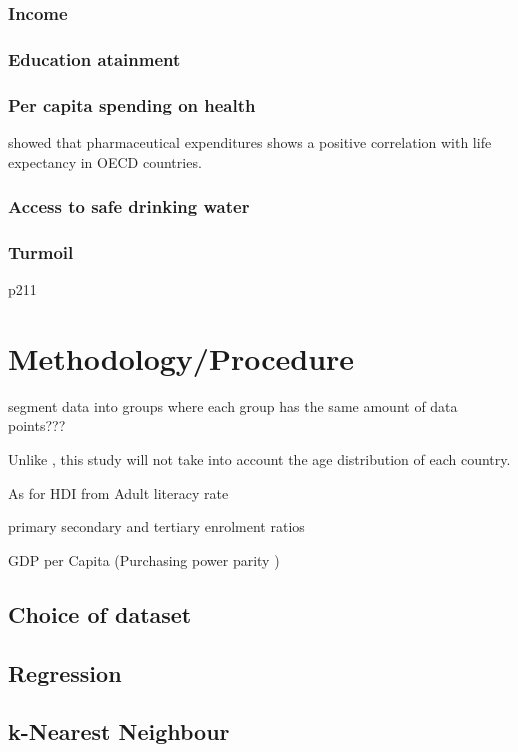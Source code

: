 \documentclass[10pt,a4paper]{article}
\begin{document}
\subsubsection{Income}

\subsubsection{Education atainment}

\subsubsection{Per capita spending on health}

\cite{Shaw2005} showed that pharmaceutical expenditures shows a positive correlation with life expectancy in OECD countries.

\subsubsection{Access to safe drinking water}

\subsubsection{Turmoil}
\citep{Low2008} p211

\section{Methodology/Procedure}

segment data into groups where each group has the same amount of data points???

Unlike \cite{Shaw2005}, this study will not take into account the age distribution of each country.

As for HDI from \cite{Bulled2010}
Adult literacy rate

primary secondary and tertiary enrolment ratios

GDP per Capita (Purchasing power parity )

\subsection{Choice of dataset}

\subsection{Regression}

\subsection{k-Nearest Neighbour}
\end{document}
